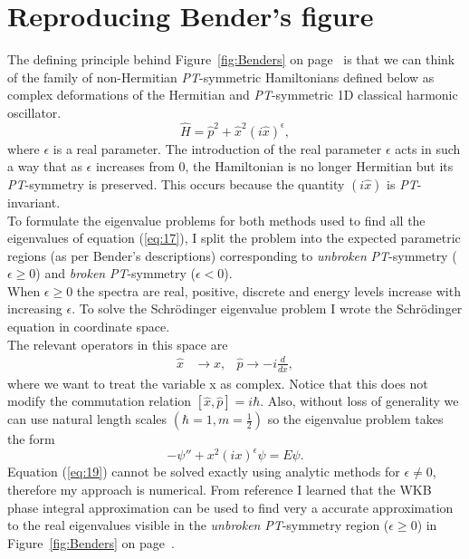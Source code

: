 \documentclass[10pt, a4paper, singlespacing]{report}
\newcommand\PT{\emph{PT}}
\begin{document}
\chapter{Reproducing Bender's figure}\label{Benders}
The defining principle behind Figure~\ref{fig:Benders} on page~\pageref{fig:Benders} is that we can think of the family of non-Hermitian \PT-symmetric Hamiltonians defined below as complex deformations of the Hermitian and \PT-symmetric 1D classical harmonic oscillator.
\begin{equation}\label{eq:17}
\hat{H} = \hat{p}^2 + \hat{x}^2 (i \hat{x})^{\epsilon},
\end{equation}
where $\epsilon$ is a real parameter. The introduction of the real parameter $\epsilon$ acts in such a way that as $\epsilon$ increases from $0$, the Hamiltonian is no longer Hermitian but its \PT-symmetry is preserved. This occurs because the quantity $(i\hat{x})$ is \PT-invariant\cite{BenderPT}\cite{Bender}.\\ 
To formulate the eigenvalue problems for both methods used to find all the eigenvalues of equation (\ref{eq:17}), I split the problem into the expected parametric regions (as per Bender's descriptions) corresponding to \emph{unbroken} \PT-symmetry ($\epsilon \geq 0$) and \emph{broken} \PT-symmetry ($\epsilon < 0$).\\
When $\epsilon \geq 0$ the spectra are real, positive, discrete and energy levels increase with increasing $\epsilon$.
To solve the Schrödinger eigenvalue problem I wrote the Schrödinger equation in coordinate space.\\
The relevant operators in this space are
\begin{align} \label{eq:18}
\hat{x}& \rightarrow x, &\hat{p}\rightarrow -i \frac{d}{dx},
\end{align}
where we want to treat the variable x as complex. Notice that this does not modify the commutation relation $[\hat{x}, \hat{p}] = i\hbar$. Also, without loss of generality we can use natural length scales $(\hbar = 1, m = \frac{1}{2})$ so the eigenvalue problem takes the form
\begin{equation}\label{eq:19}
-\psi'' + x^2 (i x)^{\epsilon} \psi = E \psi.
\end{equation}
Equation (\ref{eq:19}) cannot be solved exactly using analytic methods for $\epsilon \neq 0$, therefore my approach is numerical. From reference \cite{Bender} I learned that the WKB phase integral approximation can be used to find very a accurate approximation to the real eigenvalues visible in the \emph{unbroken} \PT-symmetry region ($\epsilon \geq 0$) in Figure~\ref{fig:Benders} on page~\pageref{fig:Benders}. 
\end{document}
